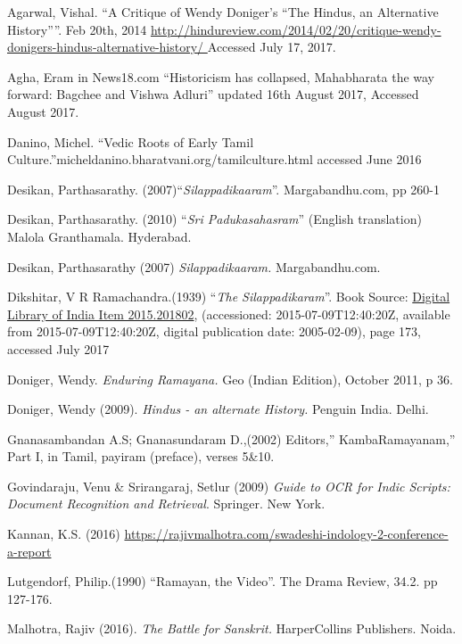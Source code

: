 \begin{thebibliography}{99}
 Agarwal, Vishal. “A Critique of Wendy Doniger’s “The Hindus, an Alternative History””. Feb 20th, 2014 \url{http://hindureview.com/2014/02/20/critique-wendy-donigers-hindus-alternative-history/ } Accessed July 17, 2017.

  Agha, Eram in News18.com “Historicism has collapsed, Mahabharata the way forward: Bagchee and Vishwa Adluri” updated 16th August 2017, Accessed August 2017.

  Danino, Michel. “Vedic Roots of Early Tamil Culture.”micheldanino.bharatvani.org/tamilculture.html accessed June 2016

  Desikan, Parthasarathy. (2007)“\textit{Silappadikaaram}”. Margabandhu.com, pp 260-1

  Desikan, Parthasarathy. (2010) “\textit{Sri Padukasahasram}” (English translation) Malola Granthamala. Hyderabad.

  Desikan, Parthasarathy (2007) \textit{Silappadikaaram.} Margabandhu.com.

  Dikshitar, V R Ramachandra.(1939) “\textit{The Silappadikaram}”. Book Source: \url{Digital Library of India Item 2015.201802}, (accessioned: 2015-07-09T12:40:20Z, available from 2015-07-09T12:40:20Z, digital publication date: 2005-02-09), page 173, accessed July 2017

  Doniger, Wendy. \textit{Enduring Ramayana.} Geo (Indian Edition), October 2011, p 36.

  Doniger, Wendy (2009). \textit{Hindus - an alternate History.} Penguin India. Delhi.

  Gnanasambandan A.S; Gnanasundaram D.,(2002) Editors,” KambaRamayanam,” Part I, in Tamil, payiram (preface), verses 5\&10.

  Govindaraju, Venu \& Srirangaraj, Setlur (2009) \textit{Guide to OCR for Indic Scripts:} \textit{Document Recognition and Retrieval}. Springer. New York.

  Kannan, K.S. (2016) \url{https://rajivmalhotra.com/swadeshi-indology-2-conference-a-report}

  Lutgendorf, Philip.(1990) “Ramayan, the Video”. The Drama Review, 34.2. pp 127-176.

  Malhotra, Rajiv (2016). \textit{The Battle for Sanskrit.} HarperCollins Publishers. Noida.


\end{thebibliography}
